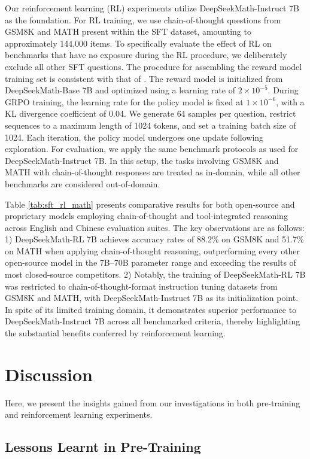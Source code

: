 \begin{itemize}[topsep=0pt]
\begin{itemize}[topsep=0pt]
Our reinforcement learning (RL) experiments utilize DeepSeekMath-Instruct 7B as the foundation. For RL training, we use chain-of-thought questions from GSM8K and MATH present within the SFT dataset, amounting to approximately 144,000 items. To specifically evaluate the effect of RL on benchmarks that have no exposure during the RL procedure, we deliberately exclude all other SFT questions. The procedure for assembling the reward model training set is consistent with that of \citep{wang2023math}. The reward model is initialized from DeepSeekMath-Base 7B and optimized using a learning rate of $2\times10^{-5}$. During GRPO training, the learning rate for the policy model is fixed at $1\times10^{-6}$, with a KL divergence coefficient of 0.04. We generate $64$ samples per question, restrict sequences to a maximum length of 1024 tokens, and set a training batch size of 1024. Each iteration, the policy model undergoes one update following exploration. For evaluation, we apply the same benchmark protocols as used for DeepSeekMath-Instruct 7B. In this setup, the tasks involving GSM8K and MATH with chain-of-thought responses are treated as in-domain, while all other benchmarks are considered out-of-domain.

Table \ref{tab:sft_rl_math} presents comparative results for both open-source and proprietary models employing chain-of-thought and tool-integrated reasoning across English and Chinese evaluation suites. The key observations are as follows: 1) DeepSeekMath-RL 7B achieves accuracy rates of 88.2\% on GSM8K and 51.7\% on MATH when applying chain-of-thought reasoning, outperforming every other open-source model in the 7B–70B parameter range and exceeding the results of most closed-source competitors. 2) Notably, the training of DeepSeekMath-RL 7B was restricted to chain-of-thought-format instruction tuning datasets from GSM8K and MATH, with DeepSeekMath-Instruct 7B as its initialization point. In spite of its limited training domain, it demonstrates superior performance to DeepSeekMath-Instruct 7B across all benchmarked criteria, thereby highlighting the substantial benefits conferred by reinforcement learning.

\section{Discussion}
Here, we present the insights gained from our investigations in both pre-training and reinforcement learning experiments.

\subsection{Lessons Learnt in Pre-Training}


\end{itemize}
\end{itemize}
